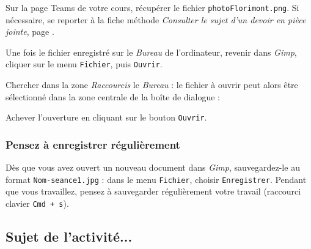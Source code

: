 Sur la page Teams de votre cours, récupérer le fichier \texttt{photoFlorimont.png}. Si nécessaire, se reporter à la fiche méthode \emph{Consulter le sujet d'un devoir en pièce jointe}, page \pageref{consulterDevoir}.

Une fois le fichier enregistré sur le \emph{Bureau} de l'ordinateur, revenir dans \emph{Gimp}, cliquer sur le menu \texttt{Fichier}, puis \texttt{Ouvrir}.


Chercher dans la zone \emph{Raccourcis} le \emph{Bureau} : le fichier à ouvrir peut alors être sélectionné dans la zone centrale de la boîte de dialogue :


Achever l'ouverture en cliquant sur le bouton \texttt{Ouvrir}.

\subsubsection{Pensez à enregistrer régulièrement}

Dès que vous avez ouvert un nouveau document dans \emph{Gimp}, sauvegardez-le au format \texttt{Nom-seance1.jpg} : dans le menu \texttt{Fichier}, choisir \texttt{Enregistrer}. Pendant que vous travaillez, pensez à sauvegarder régulièrement votre travail (raccourci clavier \texttt{Cmd + s}).   




\subsection{Sujet de l'activité...}

\vspace{10pt}


